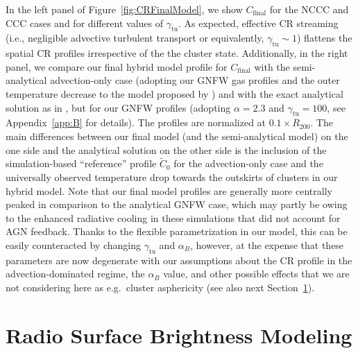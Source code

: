 \documentclass[traditabstract]{aa}
\newcommand{\rmn}{\mathrm}
\begin{document}
In the left panel of Figure~\ref{fig:CRFinalModel}, we show $C_{\rmn{final}}$
for the NCCC and CCC cases and for different values of $\gamma_{\rmn{tu}}$. As
expected, effective CR streaming (i.e., negligible advective turbulent transport
or equivalently, $\gamma_{\rmn{tu}}\sim1$) flattens the spatial CR profiles
irrespective of the the cluster state. Additionally, in the right panel, we
compare our final hybrid model profile for $C_{\rmn{final}}$ with the
semi-analytical advection-only case (adopting our GNFW gas profiles and the
outer temperature decrease to the model proposed by \citep{2010MNRAS.409..449P})
and with the exact analytical solution as in \citet{2011A&A...527A..99E}, but
for our GNFW profiles (adopting $\alpha=2.3$ and $\gamma_{\rmn{tu}}=100$, see
Appendix~\ref{app:B} for details).  The profiles are normalized at $0.1 \times
R_{200}$. The main differences between our final model (and the semi-analytical
model) on the one side and the analytical solution on the other side is the
inclusion of the simulation-based ``reference'' profile $\tilde{C}_0$ for the
advection-only case and the universally observed temperature drop towards the
outskirts of clusters in our hybrid model. Note that our final model profiles
are generally more centrally peaked in comparison to the analytical GNFW case,
which may partly be owing to the enhanced radiative cooling in these simulations
\cite{2010MNRAS.409..449P} that did not account for AGN feedback. Thanks to the
flexible parametrization in our model, this can be easily counteracted by
changing $\gamma_{\rmn{tu}}$ and $\alpha_B$, however, at the expense that these
parameters are now degenerate with our assumptions about the CR profile in the
advection-dominated regime, the $\alpha_B$ value, and other possible effects
that we are not considering here as e.g.~cluster asphericity (see also next
Section~\ref{sec:3}).


\section{Radio Surface Brightness Modeling}
\label{sec:3}
\end{document}
